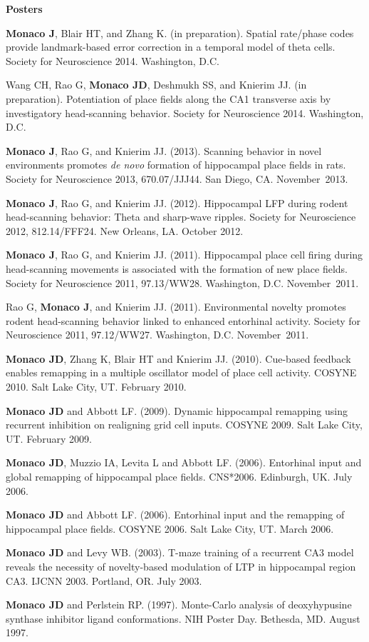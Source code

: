 \documentclass[10pt]{article}
\begin{document}
\begin{description}
\item \textbf{Posters}
\item[\quad] \textbf{Monaco J}, Blair HT, and Zhang K. (in preparation). Spatial rate/phase codes provide landmark-based error correction in a temporal model of theta cells. Society for Neuroscience 2014. Washington, D.C.
\item[\quad] Wang CH, Rao G, \textbf{Monaco JD}, Deshmukh SS, and Knierim JJ. (in preparation). Potentiation of place fields along the CA1 transverse axis by investigatory head-scanning behavior. Society for Neuroscience 2014. Washington, D.C.
\item[\quad] \textbf{Monaco J}, Rao G, and Knierim JJ. (2013). Scanning behavior in novel environments promotes \emph{de novo} formation of hippocampal place fields in rats. Society for Neuroscience 2013, 670.07/JJJ44. San Diego, CA. November~2013.
\item[\quad] \textbf{Monaco J}, Rao G, and Knierim JJ. (2012). Hippocampal LFP during rodent head-scanning behavior: Theta and sharp-wave ripples. Society for Neuroscience 2012, 812.14/FFF24. New Orleans, LA. October 2012.
\item[\quad] \textbf{Monaco J}, Rao G, and Knierim JJ. (2011). Hippocampal place cell firing during head-scanning movements is associated with the formation of new place fields. Society for Neuroscience 2011, 97.13/WW28. Washington, D.C. November~2011.
\item[\quad] Rao G, \textbf{Monaco J}, and Knierim JJ. (2011). Environmental novelty promotes rodent head-scanning behavior linked to enhanced entorhinal activity. Society for Neuroscience 2011, 97.12/WW27. Washington, D.C. November~2011.
\item[\quad] \textbf{Monaco JD}, Zhang K, Blair HT and Knierim JJ. (2010). Cue-based feedback enables remapping in a multiple oscillator model of place cell activity. COSYNE 2010. Salt Lake City, UT. February 2010.
\item[\quad] \textbf{Monaco JD} and Abbott LF. (2009). Dynamic hippocampal remapping using recurrent inhibition on realigning grid cell inputs. COSYNE 2009. Salt Lake City, UT. February 2009.
\item[\quad] \textbf{Monaco JD}, Muzzio IA, Levita L and Abbott LF. (2006). Entorhinal input and global remapping of hippocampal place fields. CNS*2006. Edinburgh, UK. July 2006.
\item[\quad] \textbf{Monaco JD} and Abbott LF. (2006). Entorhinal input and the remapping of hippocampal place fields. COSYNE 2006. Salt Lake City, UT. March 2006.
\item[\quad] \textbf{Monaco JD} and Levy WB. (2003). T-maze training of a recurrent CA3 model reveals the necessity of novelty-based modulation of LTP in hippocampal region CA3. IJCNN 2003. Portland, OR. July 2003.
\item[\quad] \textbf{Monaco JD} and Perlstein RP. (1997). Monte-Carlo analysis of deoxyhypusine synthase inhibitor ligand conformations. NIH Poster Day. Bethesda, MD. August 1997. 
\end{description}
\end{document}
